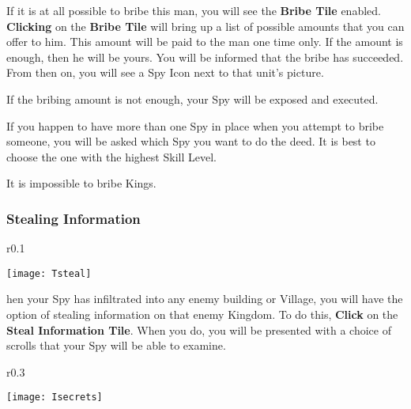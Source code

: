 
If it is at all possible to bribe this man, you will see the \textbf{Bribe Tile} enabled. \textbf{Clicking} on the \textbf{Bribe Tile} will bring up a list of possible amounts that you can offer to him. This amount will be paid to the man one time only. If the amount is enough, then he will be yours. You will be informed that the bribe has succeeded. From then on, you will see a Spy Icon next to that unit’s picture.

If the bribing amount is not enough, your Spy will be exposed and executed.

If you happen to have more than one Spy in place when you attempt to bribe someone, you will be asked which Spy you want to do the deed. It is best to choose the one with the highest Skill Level.

It is impossible to bribe Kings.

\subsubsection{\textsf{Stealing Information}}


\begin{wrapfigure}{r}{0.1\textwidth}
    \vspace{-20pt}
    \begin{center}
        \texttt{[image: Tsteal]}
    \end{center}
    \vspace{-20pt}
\end{wrapfigure}

hen your Spy has infiltrated into any enemy building or Village, you will have the option of stealing information on that enemy Kingdom. To do this, \textbf{Click} on the \textbf{Steal Information Tile}. When you do, you will be presented with a choice of scrolls that your Spy will be able to examine.

\begin{wrapfigure}{r}{0.3\textwidth}
    \vspace{-20pt}
    \begin{center}
        \texttt{[image: Isecrets]} %
    \end{center}
    \vspace{-20pt}
\end{wrapfigure}

